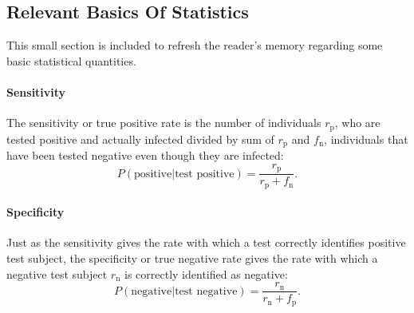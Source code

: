 \subsection{Relevant Basics Of Statistics}
This small section is included to refresh the reader's memory regarding some basic statistical quantities. 
\paragraph{Sensitivity}
The sensitivity or true positive rate is the number of individuals $r_\text{p}$, who are tested positive and actually infected divided by sum of $r_\text{p}$ and $f_\text{n}$, individuals that have been tested negative even though they are infected:
\begin{equation}
P(\text{positive} | \text{test positive}) = \frac{r_\text{p}}{r_\text{p} + f_\text{n}}.
\end{equation}

\paragraph{Specificity}
Just as the sensitivity gives the rate with which a test correctly identifies positive test subject, the specificity or true negative rate gives the rate with which a negative test subject $r_\text{n}$ is correctly identified as negative:
\begin{equation}
P(\text{negative} | \text{test negative}) = \frac{r_\text{n}}{r_\text{n} + f_\text{p}}.
\end{equation}